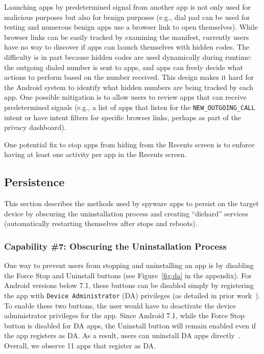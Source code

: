 \documentclass[sigconf,balance=false]{acmart}
\newcommand{\alex}[1]{\textcolor{chicagomaroon}{\noindent[AL: #1]}}
\newcommand{\damon}[1]{\textcolor{blue}{\noindent[DM: #1]}}
\newcommand{\alex}[1]{}
\newcommand{\damon}[1]{}
\begin{document}
Launching apps by predetermined signal from another app is not only used for
malicious purposes but also for benign purposes (e.g., dial pad can be used for
testing and numerous benign apps use a browser link to open themselves).
While browser links can be easily tracked by examining the manifest, currently
users have no way to discover if apps can launch themselves with hidden codes.
The difficulty is in part because hidden codes are used dynamically during
runtime: the outgoing dialed number is sent to apps, and apps can freely decide
what actions to perform based on the number received. This design makes it hard
for the Android system to identify what hidden numbers are being tracked by each
app.  One possible mitigation is to allow users to review apps that can receive predetermined signals (e.g., a list of apps that listen for the
\texttt{NEW\_OUTGOING\_CALL} intent or have intent filters for specific browser links,
perhaps as part of the privacy dashboard).

One potential fix to stop apps from hiding from the Recents screen is to enforce
having at least one activity per app in the Recents screen.




\subsection{Persistence}
\label{subsec:persistence}
This section describes the methods used by spyware apps to persist on the target
device by obscuring the uninstallation process and creating ``diehard'' services
(automatically restarting themselves after stops and reboots).


\subsubsection*{Capability \#7: Obscuring the Uninstallation Process}

One way to prevent users from stopping and uninstalling an app is by
disabling the Force Stop and Uninstall buttons (see
Figure~\ref{fig:da} in the appendix).  For Android versions below 7.1,
these buttons can be disabled simply by registering the app with
\texttt{Device Administrator} (DA) privileges (as detailed in prior
work~\cite{shan2019device}). To enable these two buttons, the user
would have to deactivate the device administrator privileges for the
app.
%
Since Android 7.1, while the Force Stop button is disabled for DA
apps, the Uninstall button will remain enabled even if the app
registers as DA.  As a result, users can uninstall DA apps
directly~\cite{shan2019device}. Overall, we observe 11 apps that
register as DA.
\end{document}
